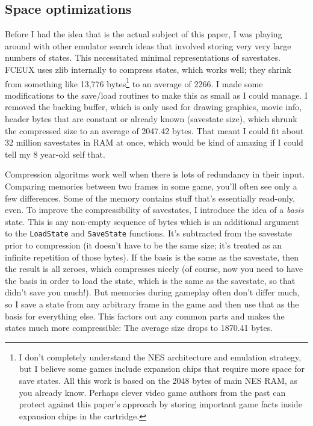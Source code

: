 \documentclass[twocolumn]{article}
\begin{document}
\subsection{Space optimizations}

Before I had the idea that is the actual subject of this paper, I was
playing around with other emulator search ideas that involved storing
very very large numbers of states. This necessitated minimal
representations of savestates. FCEUX uses zlib internally to compress
states, which works well; they shrink from something like 13,776
bytes\footnote{I don't completely understand the NES architecture and
  emulation strategy, but I believe some games include expansion chips
  that require more space for save states. All this work is based on
  the 2048 bytes of main NES RAM, as you already know. Perhaps clever
  video game authors from the past can protect against this paper's
  approach by storing important game facts inside expansion chips
  in the cartridge.} to an average of 2266. I made some modifications
to the save/load routines to make this as small as I could manage.
I removed the backing buffer, which is only used for drawing graphics,
movie info, header bytes that are constant or already known (savestate
size), which shrunk the compressed size to an average of 2047.42 bytes.
That meant I could fit about 32 million savestates in RAM at once, which
would be kind of amazing if I could tell my 8 year-old self that.

Compression algoritms work well when there is lots of redundancy in
their input. Comparing memories between two frames in some game,
you'll often see only a few differences. Some of the memory contains
stuff that's essentially read-only, even. To improve the
compressibility of savestates, I introduce the idea of a {\em basis}
state. This is any non-empty sequence of bytes which is an additional
argument to the {\tt LoadState} and {\tt SaveState} functions. It's
subtracted from the savestate prior to compression (it doesn't have to
be the same size; it's treated as an infinite repetition of those
bytes). If the basis is the same as the savestate, then the result is
all zeroes, which compresses nicely (of course, now you need to have
the basis in order to load the state, which is the same as the
savestate, so that didn't save you much!). But memories during
gameplay often don't differ much, so I save a state from any arbitrary
frame in the game and then use that as the basis for everything else.
This factors out any common parts and makes the states much more
compressible: The average size drops to 1870.41 bytes.
\end{document}
